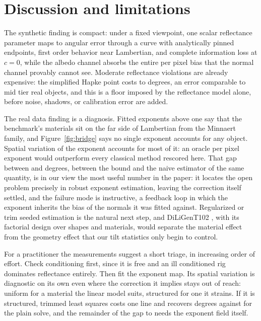 \documentclass[10pt,twocolumn,letterpaper]{article}
\begin{document}
\section{Discussion and limitations}

The synthetic finding is compact: under a fixed viewpoint, one scalar
reflectance parameter maps to angular error through a curve with analytically
pinned endpoints, first order behavior near Lambertian, and complete
information loss at $c = 0$, while the albedo channel absorbs the entire per
pixel bias that the normal channel provably cannot see. Moderate reflectance
violations are already expensive: the simplified Hapke point costs
\rigMin{} to \rigMax{} degrees, an error comparable to mid tier real objects,
and this is a floor imposed by the reflectance model alone, before noise,
shadows, or calibration error are added.

The real data finding is a diagnosis. Fitted exponents above one say that the
benchmark's materials sit on the far side of Lambertian from the Minnaert
family, and Figure~\ref{fig:bridge} says no single exponent accounts for any
object. Spatial variation of the exponent accounts for most of it: an oracle
per pixel exponent would outperform every classical method rescored here. That
gap between \oraclePixAvg{} and \naiveAvg{} degrees, between the bound and the
naive estimator of the same quantity, is in our view the most useful number in
the paper: it locates the open problem precisely in robust exponent
estimation, leaving the correction itself settled, and the failure mode is
instructive, a feedback loop in which the exponent inherits the bias of the
normals it was fitted against. Regularized or trim seeded estimation is the
natural next step, and DiLiGenT102 \cite{ren2022}, with its factorial design
over shapes and materials, would separate the material effect from the
geometry effect that our tilt statistics only begin to control.

For a practitioner the measurements suggest a short triage, in increasing
order of effort. Check conditioning first, since it is free and an ill
conditioned rig dominates reflectance entirely. Then fit the exponent map. Its
spatial variation is diagnostic on its own even where the correction it
implies stays out of reach: uniform for a material the linear model suits,
structured for one it strains. If it is structured, trimmed least squares
costs one line and recovers \trimAvg{} degrees against \diligentAvg{} for the
plain solve, and the remainder of the gap to \oraclePixAvg{} needs the
exponent field itself.
\end{document}
